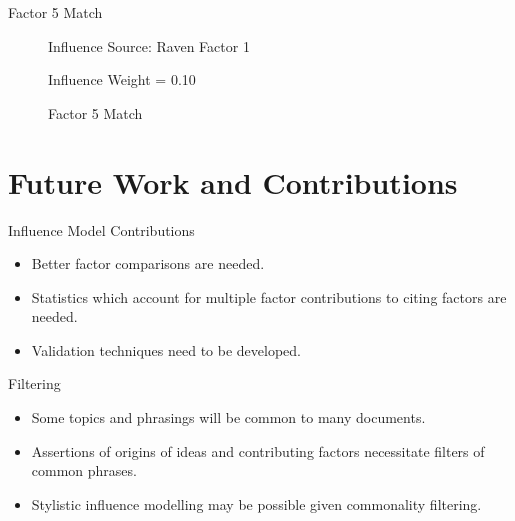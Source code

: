 \documentclass{beamer}
\begin{document}
\begin{frame}{Factor 5 Match}
\begin{figure}%
    \centering
    \qquad
    \caption{Factor 5 Match}%
    \label{fig:com5}%
    Influence Source: Raven Factor 1 
    \par Influence Weight = 0.10
\end{figure}
\end{frame}


\section{Future Work and Contributions}
\begin{frame}{Influence Model Contributions}
    \begin{itemize}[<+->]
        \item Better factor comparisons are needed.
        \item Statistics which account for multiple factor contributions to citing factors are needed.
        \item Validation techniques need to be developed.
    \end{itemize}
\end{frame}

\begin{frame}{Filtering}
    \begin{itemize}[<+->]
        \item Some topics and phrasings will be common to many documents.
        \item Assertions of origins of ideas and contributing factors necessitate filters of common phrases.
        \item Stylistic influence modelling may be possible given commonality filtering.
    \end{itemize}
\end{frame}
\end{document}
